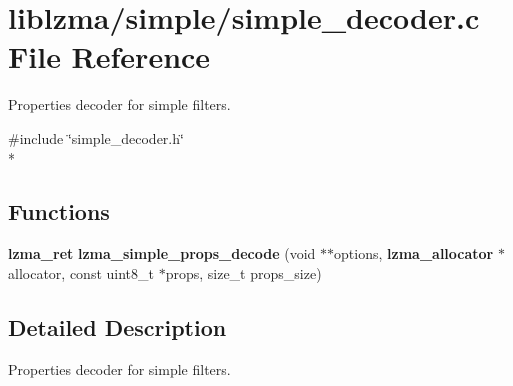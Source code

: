 \section{liblzma/simple/simple\-\_\-decoder.c File Reference}
\label{simple__decoder_8c}


Properties decoder for simple filters.  


{\ttfamily \#include \char`\"{}simple\-\_\-decoder.\-h\char`\"{}}\\*
\subsection*{Functions}
\begin{DoxyCompactItemize}
\item 
{\bf lzma\-\_\-ret} {\bfseries lzma\-\_\-simple\-\_\-props\-\_\-decode} (void $\ast$$\ast$options, {\bf lzma\-\_\-allocator} $\ast$allocator, const uint8\-\_\-t $\ast$props, size\-\_\-t props\-\_\-size)\label{simple__decoder_8c_ad9066c7528f3006c61c2d7f0f725cd67}

\end{DoxyCompactItemize}


\subsection{Detailed Description}
Properties decoder for simple filters. 